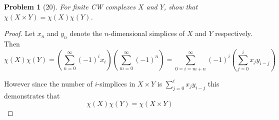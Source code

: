 \documentclass[10pt]{article}
\newcommand{\sk}{\vskip 10mm}
\theoremstyle{plain}
\newtheorem{problem}{Problem}
\theoremstyle{remark}
\begin{document}
\sk

\begin{problem}[20]
  For finite CW complexes $X$ and $Y$, show that
  $\chi(X\times Y)=\chi(X)\chi(Y)$.
\end{problem}

\begin{proof}
  Let $x_n$ and $y_n$ denote the $n$-dimensional simplices of $X$ and $Y$
  respectively. Then
  \[
    \chi(X)\chi(Y)=\left(\sum_{n=0}^\infty(-1)^ix_i\right)\left(\sum_{m=0}^\infty(-1)^n\right)=\sum_{0=i=m+n}^\infty(-1)^{i}\left(\sum_{j=0}^ix_jy_{i-j}\right)
  \]

  However since the number of $i$-simplices in $X\times Y$ is $\sum_{j=0}^ix_jy_{i-j}$
  this demonstrates that
  \[
    \chi(X)\chi(Y)=\chi(X\times Y)
  \]
\end{proof}

\sk

\end{document}
